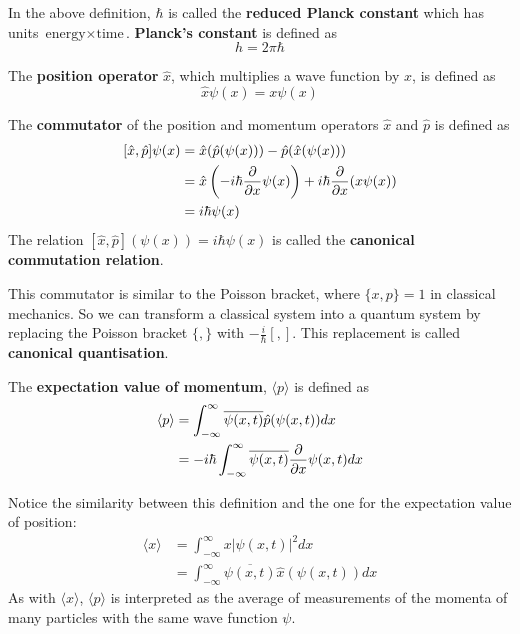 \begin{definition}
	In the above definition, $\hbar$ is called the \textbf{reduced Planck constant} which has units $\text{energy} \times \text{time}$. \textbf{Planck's constant} is defined as
	\[
		h = 2 \pi \hbar
	\]
\end{definition}

\begin{definition}
	The \textbf{position operator} $\hat{x}$, which multiplies a wave function by $x$, is defined as
	\[
		\hat{x} \psi(x) = x \psi(x)
	\]
\end{definition}

\begin{definition}
	The \textbf{commutator} of the position and momentum operators $\hat{x}$ and $\hat{p}$ is defined as
	\[
		\begin{aligned}
			\relax [\hat{x}, \hat{p}] \psi(x)
				& = \hat{x} (\hat{p} (\psi(x))) - \hat{p} (\hat{x} (\psi(x))) \\
				& = \hat{x} \left( -i \hbar \diffp{}{x} \psi(x) \right)	+ i \hbar \diffp{}{x} (x \psi(x)) \\
				& = i \hbar \psi(x)
		\end{aligned}
	\]
	The relation $[\hat{x}, \hat{p}] (\psi(x)) = i \hbar \psi(x)$ is called the \textbf{canonical commutation relation}.
\end{definition}

\begin{remark}
	This commutator is similar to the Poisson bracket, where $\{ x, p \} = 1$ in classical mechanics. So we can transform a classical system into a quantum system by replacing the Poisson bracket $\{ , \}$ with $-\frac{i}{\hbar} [,]$. This replacement is called \textbf{canonical quantisation}.
\end{remark}

\begin{definition}
	The \textbf{expectation value of momentum}, $\langle p \rangle$ is defined as
	\[
		\begin{aligned}
			\langle p \rangle
				& = \int_{-\infty}^{\infty} \overline{\psi(x, t)} \hat{p} (\psi(x, t)) dx \\
				& = -i \hbar \int_{-\infty}^{\infty} \overline{\psi(x, t)} \diffp{}{x} \psi(x, t) dx
		\end{aligned}
	\]
\end{definition}

\begin{remark}
	Notice the similarity between this definition and the one for the expectation value of position:
	\[
		\begin{aligned}
			\langle x \rangle
				& = \int_{-\infty}^{\infty} x |\psi(x, t)|^2 dx \\
				& = \int_{-\infty}^{\infty} \overline{\psi(x, t)} \hat{x} (\psi(x, t)) dx
		\end{aligned}
	\]
	As with $\langle x \rangle$, $\langle p \rangle$ is interpreted as the average of measurements of the momenta of many particles with the same wave function $\psi$.
\end{remark}

